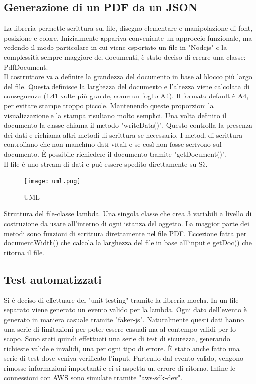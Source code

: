 \documentclass[12pt]{article}
\begin{document}
\subsection{Generazione di un PDF da un JSON}
La libreria permette scrittura sul file, disegno elementare e manipolazione di 
font, posizione e colore.
Inizialmente appariva conveniente un approccio funzionale, ma vedendo il modo 
particolare in cui viene esportato un file in "Nodejs" e la complessità sempre 
maggiore dei documenti, è stato deciso di creare una classe: PdfDocument. 
\\
Il costruttore va a definire la grandezza del documento in base al blocco più 
largo del file.
Questa definisce la larghezza del documento e l'altezza viene calcolata di
conseguenza (1.41 volte più grande, come un foglio A4).
Il formato default è A4, per evitare stampe troppo piccole.
Mantenendo queste proporzioni la visualizzazione e la stampa risultano molto 
semplici.
Una volta definito il documento la classe chiama il metodo "writeData()".
Questo controlla la presenza dei dati e richiama altri metodi di scrittura 
se necessario.
I metodi di scrittura controllano che non manchino dati vitali e se così non fosse 
scrivono sul documento. 
È possibile richiedere il documento tramite "getDocument()". 
\\ Il file è uno stream di dati e può essere spedito direttamente su S3. 

\begin{figure}[H]
\texttt{[image: uml.png]}
\centering
\caption{UML}
\end{figure}
Struttura del file-classe lambda. 
Una singola classe che crea 3 variabili a livello di costruzione da usare 
all'interno di ogni istanza del oggetto. 
La maggior parte dei metodi sono funzioni di scrittura direttamente 
nel file PDF.
Eccezione fatta per documentWidth() che calcola la larghezza del file in base 
all'input e getDoc() che ritorna il file. 

\subsection{Test automatizzati}
Si è deciso di effettuare del "unit testing" tramite la libreria mocha.
In un file separato viene generato un evento valido per la lambda.
Ogni dato dell'evento è generato in maniera casuale tramite "faker-js". 
Naturalmente questi dati hanno una serie di limitazioni per poter essere 
casuali ma al contempo validi per lo scopo. 
Sono stati quindi effettuati una serie di test di sicurezza, generando 
richieste valide e invalidi, una per ogni tipo di errore. 
È stato anche fatto una serie di test dove veniva verificato l'input. 
Partendo dal evento valido, vengono rimosse informazioni importanti e ci si 
aspetta un errore di ritorno.
Infine le connessioni con AWS sono simulate tramite "aws-sdk-dev". 
\end{document}
